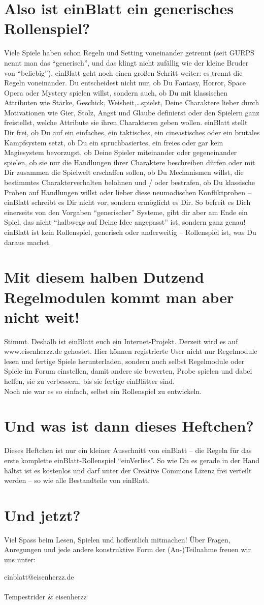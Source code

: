 \section {Also ist einBlatt ein generisches Rollenspiel?}
Viele Spiele haben schon Regeln und Setting voneinander getrennt (seit GURPS nennt man das "`generisch"', und das klingt nicht zufällig wie der kleine Bruder von "`beliebig"'). einBlatt geht noch einen großen Schritt weiter: es trennt die Regeln voneinander. Du entscheidest nicht nur, ob Du Fantasy, Horror, Space Opera oder Mystery spielen willst, sondern auch, ob Du mit klassischen Attributen wie Stärke, Geschick, Weisheit,\dots spielst, Deine Charaktere lieber durch Motivationen wie Gier, Stolz, Angst und Glaube definierst oder den Spielern ganz freistellst, welche Attribute sie ihren Charakteren geben wollen. einBlatt stellt Dir frei, ob Du auf ein einfaches, ein taktisches, ein cineastisches oder ein brutales Kampfsystem setzt, ob Du ein spruchbasiertes, ein freies oder gar kein Magiesystem bevorzugst, ob Deine Spieler miteinander oder gegeneinander spielen, ob sie nur die Handlungen ihrer Charaktere beschreiben dürfen oder mit Dir zusammen die Spielwelt erschaffen sollen, ob Du Mechanismen willst, die bestimmtes Charakterverhalten belohnen und / oder bestrafen, ob Du klassische Proben auf Handlungen willst oder lieber diese neumodischen Konfliktproben -- einBlatt schreibt es Dir nicht vor, sondern ermöglicht es Dir. So befreit es Dich einerseits von den Vorgaben "`generischer"' Systeme, gibt dir aber am Ende ein Spiel, das nicht "`halbwegs auf Deine Idee angepasst"' ist, sondern ganz genau!
\\
einBlatt ist kein Rollenspiel, generisch oder anderweitig -- Rollenspiel ist, was Du daraus machst.

\section {Mit diesem halben Dutzend Regelmodulen kommt man aber nicht weit!}
Stimmt. Deshalb ist einBlatt euch ein Internet-Projekt. Derzeit wird es auf www.eisenherzz.de gehostet. Hier können registrierte User nicht nur Regelmodule lesen und fertige Spiele herunterladen, sondern auch selbst Regelmodule oder Spiele im Forum einstellen, damit andere sie bewerten, Probe spielen und dabei helfen, sie zu verbessern, bis sie fertige einBlätter sind.
\\
Noch nie war es so einfach, selbst ein Rollenspiel zu entwickeln.

\section {Und was ist dann dieses Heftchen?}
Dieses Heftchen ist nur ein kleiner Ausschnitt von einBlatt -- die Regeln für das erste komplette einBlatt-Rollenspiel "`einVerlies"'. So wie Du es gerade in der Hand hältst ist es kostenlos und darf unter der Creative Commons Lizenz frei verteilt werden -- so wie alle Bestandteile von einBlatt. 

\section {Und jetzt?}
Viel Spass beim Lesen, Spielen und hoffentlich mitmachen! Über Fragen, Anregungen und jede andere konstruktive Form der (An-)Teilnahme freuen wir uns unter:

einblatt@eisenherzz.de
\\
\\
Tempestrider \& eisenherzz
